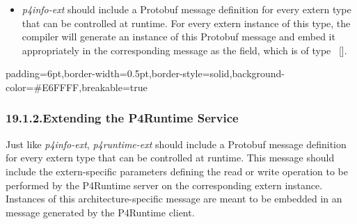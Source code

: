 \documentclass[11pt]{article}
\begin{document}
{\begin{itemize}[noitemsep,topsep=\mdcompacttopsep]
\item{}\emph{p4info-ext} should include a Protobuf message definition for every extern
type that can be controlled at runtime. For every extern instance of this
type, the compiler will generate an instance of this Protobuf message and
embed it appropriately in the corresponding
 message as the 
field, which is of type ~[].%
\end{itemize}%

\begin{mdbmargintb}{6pt}{6pt}%
\begin{mdblock}{padding=6pt,border-width=0.5pt,border-style=solid,background-color=\#E6FFFF,breakable=true}%
\begin{mdpre}%
\end{mdpre}%
\end{mdblock}%
\end{mdbmargintb}%

\subsubsection{19.1.2.\hspace*{0.5em}Extending the P4Runtime Service}\label{sec-extending-the-p4runtime-service}%

\noindent{}Just like \emph{p4info-ext}, \emph{p4runtime-ext} should include a Protobuf message
definition for every extern type that can be controlled at runtime. This message
should include the extern-specific parameters defining the read or write
operation to be performed by the P4Runtime server on the corresponding extern
instance. Instances of this architecture-specific message are meant to be
embedded in an~ message generated by the
P4Runtime client.%

}
\end{document}
